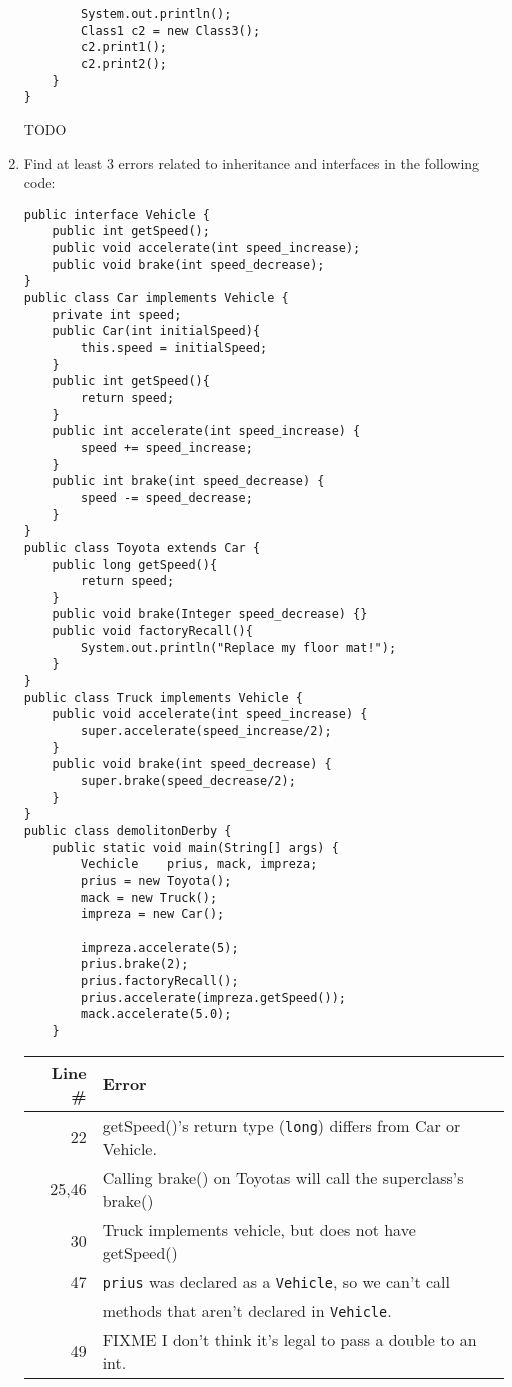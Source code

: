 \documentclass[11pt]{article}
\newenvironment{answer}{\large\lstset{basicstyle=\large}\color{white}}{}
\newenvironment{answer}{\large\lstset{basicstyle=\large}\color{red}}{}
\begin{document}
\begin{enumerate}
\begin{lstlisting}
		System.out.println();
		Class1 c2 = new Class3();
		c2.print1();
		c2.print2();
	}
}
\end{lstlisting}
    
    \begin{answer}
    \huge TODO
    \end{answer}

\pagebreak
\item Find at least 3 errors related to inheritance and interfaces in the
      following code:\label{demolition-derby}
\begin{lstlisting}
public interface Vehicle {
	public int getSpeed();
	public void accelerate(int speed_increase);
	public void brake(int speed_decrease);
}
public class Car implements Vehicle {
	private int speed;
	public Car(int initialSpeed){
		this.speed = initialSpeed;
	}
	public int getSpeed(){
		return speed;
	}
	public int accelerate(int speed_increase) {
		speed += speed_increase;
	}
	public int brake(int speed_decrease) {
		speed -= speed_decrease;
	}
}
public class Toyota extends Car {
	public long getSpeed(){
		return speed;
	}
	public void brake(Integer speed_decrease) {}
	public void factoryRecall(){
		System.out.println("Replace my floor mat!");
	}
}
public class Truck implements Vehicle {
	public void accelerate(int speed_increase) {
		super.accelerate(speed_increase/2);
	}
	public void brake(int speed_decrease) {
		super.brake(speed_decrease/2);
	}
}
public class demolitonDerby {
	public static void main(String[] args) {
		Vechicle	prius, mack, impreza;
		prius = new Toyota();
		mack = new Truck();
		impreza = new Car();
		
		impreza.accelerate(5);
		prius.brake(2);
		prius.factoryRecall();
		prius.accelerate(impreza.getSpeed());
		mack.accelerate(5.0);
	}
\end{lstlisting}

    \begin{answer}
    \begin{tabular}{r l} %
    Line \# & Error \\\hline
    22  & getSpeed()'s return type ({\tt long}) differs from Car or Vehicle.\\
    25,46& Calling brake() on Toyotas will call the superclass's brake()\\
    30  & Truck implements vehicle, but does not have getSpeed()\\
    47  & {\tt prius} was declared as a {\tt Vehicle}, so we can't call\\
    ~   & methods that aren't declared in {\tt Vehicle}.\\
    49  & FIXME I don't think it's legal to pass a double to an int.
    \end{tabular}
    \end{answer}

\end{enumerate}
\end{document}
